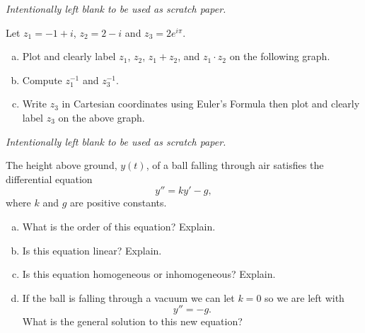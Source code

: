 \documentclass[12pt]{amsbook}
\begin{document}
\newpage
\emph{Intentionally left blank to be used as scratch paper.}\\


\newpage
\begin{problem}
Let $z_1=-1+i$, $z_2=2-i$ and $z_3=2e^{i \pi}$.  
\begin{enumerate}[(a)]
    \item Plot and clearly label $z_1$, $z_2$, $z_1+z_2$, and $z_1\cdot z_2$ on the following graph.
    \begin{center}
    \end{center}
    \vspace*{1cm}
    \item Compute $z_1^{-1}$ and $z_3^{-1}$.
    \vspace*{8cm}
    \item Write $z_3$ in Cartesian coordinates using Euler's Formula then plot and clearly label $z_3$ on the above graph.
\end{enumerate}
\end{problem}

\newpage
\emph{Intentionally left blank to be used as scratch paper.}\\


\newpage
\begin{problem}
The height above ground, $y(t)$, of a ball falling through air satisfies the differential equation
\[
y''=ky'-g,
\]
where $k$ and $g$ are positive constants.  
\begin{enumerate}[(a)]
    \item What is the order of this equation? Explain.
    \vspace*{3cm}
    \item Is this equation linear? Explain.
    \vspace*{3cm}
    \item Is this equation homogeneous or inhomogeneous? Explain.
    \vspace*{3cm}
    \item If the ball is falling through a vacuum we can let $k=0$ so we are left with
    \[
    y''=-g.
    \]
    What is the general solution to this new equation?
\end{enumerate}
\end{problem}
\end{document}
